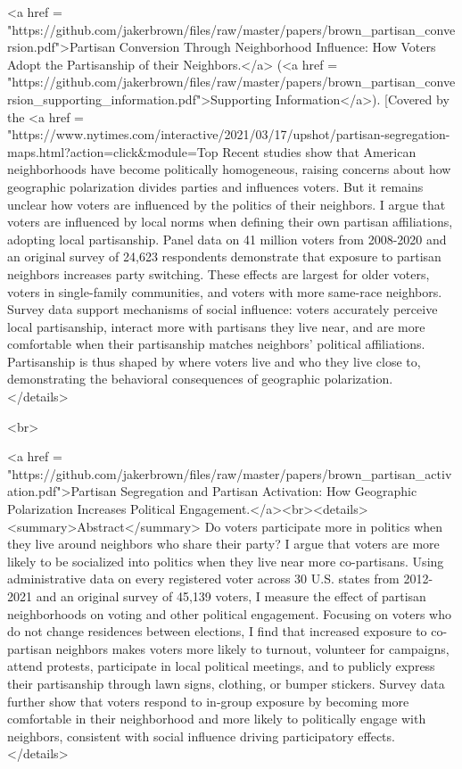     <a href = "https://github.com/jakerbrown/files/raw/master/papers/brown_partisan_conversion.pdf">Partisan Conversion Through Neighborhood Influence: How Voters Adopt the Partisanship of their Neighbors.</a> (<a href = "https://github.com/jakerbrown/files/raw/master/papers/brown_partisan_conversion_supporting_information.pdf">Supporting Information</a>). [Covered by the <a href = "https://www.nytimes.com/interactive/2021/03/17/upshot/partisan-segregation-maps.html?action=click&module=Top%
      Recent studies show that American neighborhoods have become politically homogeneous, raising concerns about how geographic polarization divides parties and influences voters. But it remains unclear how voters are influenced by the politics of their neighbors.  I argue that voters are influenced by local norms when defining their own partisan affiliations, adopting local partisanship. Panel data on 41 million voters from 2008-2020 and an original survey of 24,623 respondents demonstrate that exposure to partisan neighbors increases party switching. These effects are largest for older voters, voters in single-family communities, and voters with more same-race neighbors. Survey data support mechanisms of social influence: voters accurately perceive local partisanship, interact more with partisans they live near, and are more comfortable when their partisanship matches neighbors' political affiliations. Partisanship is thus shaped by where voters live and who they live close to, demonstrating the behavioral consequences of geographic polarization.
          </details>

          <br>

          <a href = "https://github.com/jakerbrown/files/raw/master/papers/brown_partisan_activation.pdf">Partisan Segregation and Partisan Activation: How Geographic Polarization Increases Political Engagement.</a><br><details><summary>Abstract</summary>
            Do voters participate more in politics when they live around neighbors who share their party? I argue that voters are more likely to be socialized into politics when they live near more co-partisans. Using administrative data on every registered voter across 30 U.S. states from 2012-2021 and an original survey of 45,139 voters, I measure the effect of partisan neighborhoods on voting and other political engagement. Focusing on voters who do not change residences between elections, I find that increased exposure to co-partisan neighbors makes voters more likely to turnout, volunteer for campaigns, attend protests, participate in local political meetings, and to publicly express their partisanship through lawn signs, clothing, or bumper stickers. Survey data further show that voters respond to in-group exposure by becoming more comfortable in their neighborhood and more likely to politically engage with neighbors, consistent with social influence driving participatory effects.
                </details>

